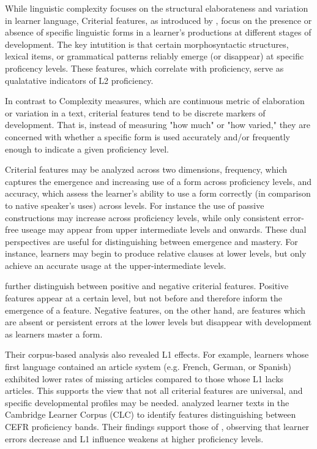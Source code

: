 While linguistic complexity focuses on the structural elaborateness and variation in learner language, Criterial
features, as introduced
    by \citet{Hawkins_Buttery_2010}, focus on the
    presence or
    absence of specific linguistic forms in a learner's
    productions at different
    stages of development. The key intutition is that certain morphosyntactic structures, lexical items, or
grammatical patterns reliably emerge (or disappear) at specific proficency levels. These features, which correlate
with proficiency, serve as qualatative indicators of L2 proficiency.

In contrast to Complexity measures, which are continuous metric of
elaboration
or variation in a text, criterial features tend to be discrete markers of development. That is, instead of measuring
"how much" or "how varied," they are concerned with whether a specific form is used accurately and/or frequently
enough to
indicate a given proficiency level.

Criterial features may be analyzed across two dimensions, frequency, which captures the emergence and increasing use
of a form across proficiency levels, and accuracy, which assess the learner's ability to use a form correctly (in
comparison
to native speaker's uses) across levels. For instance the use of passive
constructions may increase across proficiency levels, while only consistent error-free useage may appear from upper
intermediate levels and onwards. These dual perspectives are useful for distinguishing between emergence and mastery. For instance, learners may
begin to produce relative clauses at lower levels, but only achieve an accurate usage at the upper-intermediate
levels.

\citet{Hawkins_Buttery_2010} further distinguish between positive and negative criterial features.
Positive features appear at a certain level, but not before and therefore inform the emergence of a
feature.
Negative features, on the other hand, are features which are absent or persistent errors at the lower levels but
disappear with development as learners master a form.

Their corpus-based analysis also revealed L1 effects. For example, learners whose
first language contained an article system (e.g. French, German, or Spanish) exhibited lower rates of missing articles
compared to those whose L1 lacks articles. This supports the view that not all criterial features are universal, and
specific developmental profiles may be needed. \citet{salamoura2010} analyzed learner texts in the Cambridge Learner
Corpus (CLC) to identify features distinguishing between CEFR proficiency bands. Their findings support those of \citet{Hawkins_Buttery_2010,diez-bedmar2015,Kim2021}, observing that learner errors decrease and L1 influence weakens at higher proficiency levels.

